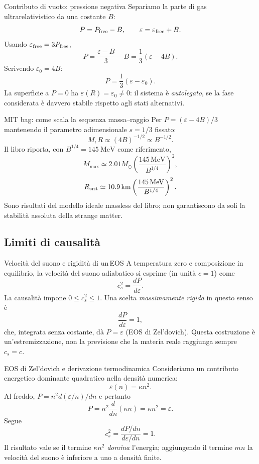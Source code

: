 \begin{frame}[t]{Contributo di vuoto: pressione negativa}
\small
Separiamo la parte di gas ultrarelativistico da una costante $B$:
\[
P=P_{\rm free}-B,\qquad
\varepsilon=\varepsilon_{\rm free}+B.
\]
Usando $\varepsilon_{\rm free}=3P_{\rm free}$,
\[
P=\frac{\varepsilon-B}{3}-B
=\frac13(\varepsilon-4B).
\]
Scrivendo $\varepsilon_0=4B$:
\[
P=\frac13(\varepsilon-\varepsilon_0).
\]
La superficie a $P=0$ ha $\varepsilon(R)=\varepsilon_0\neq0$: il sistema è \emph{autolegato}, se la fase considerata è davvero stabile rispetto agli stati alternativi.
\end{frame}

\begin{frame}[t]{MIT bag: come scala la sequenza massa--raggio}
\small
Per $P=(\varepsilon-4B)/3$ mantenendo il parametro adimensionale $s=1/3$ fissato:
\[
M,R\propto (4B)^{-1/2}\propto B^{-1/2}.
\]
Il libro riporta, con $B^{1/4}=145\ \mathrm{MeV}$ come riferimento,
\[
M_{\max}\simeq2.01M_\odot
\left(\frac{145\,\mathrm{MeV}}{B^{1/4}}\right)^2,
\]
\[
R_{\rm crit}\simeq10.9\,\mathrm{km}
\left(\frac{145\,\mathrm{MeV}}{B^{1/4}}\right)^2.
\]
Sono risultati del modello ideale massless del libro; non garantiscono da soli la stabilità assoluta della strange matter.
\end{frame}

\subsection{Limiti di causalità}

\begin{frame}[t]{Velocità del suono e rigidità di un\,EOS}
\small
A temperatura zero e composizione in equilibrio, la velocità del suono adiabatico si esprime (in unità $c=1$) come
\[
c_s^2=\frac{dP}{d\varepsilon}.
\]
La causalità impone $0\leq c_s^2\leq1$. Una scelta \emph{massimamente rigida} in questo senso è
\[
\frac{dP}{d\varepsilon}=1,
\]
che, integrata senza costante, dà $P=\varepsilon$ (EOS di Zel'dovich).
\medskip
Questa costruzione è un'estremizzazione, non la previsione che la materia reale raggiunga sempre $c_s=c$.
\end{frame}

\begin{frame}[t]{EOS di Zel'dovich e derivazione termodinamica}
\small
Consideriamo un contributo energetico dominante quadratico nella densità numerica:
\[
\varepsilon(n)=\kappa n^2.
\]
Al freddo, $P=n^2d(\varepsilon/n)/dn$ e pertanto
\[
P=n^2\frac d{dn}(\kappa n)=\kappa n^2=\varepsilon.
\]
Segue
\[
c_s^2=\frac{dP/dn}{d\varepsilon/dn}=1.
\]
Il risultato vale se il termine $\kappa n^2$ \emph{domina} l'energia; aggiungendo il termine $mn$ la velocità del suono è inferiore a uno a densità finite.
\end{frame}

